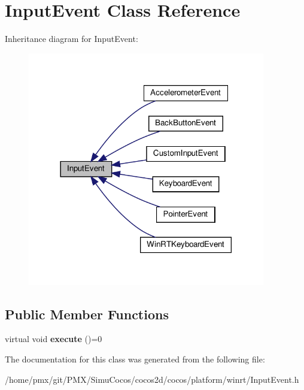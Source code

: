 \hypertarget{classInputEvent}{}\section{Input\+Event Class Reference}
\label{classInputEvent}


Inheritance diagram for Input\+Event\+:
\nopagebreak
\begin{figure}[H]
\begin{center}
\leavevmode
\includegraphics[width=294pt]{classInputEvent__inherit__graph}
\end{center}
\end{figure}
\subsection*{Public Member Functions}
\begin{DoxyCompactItemize}
\item 
\mbox{\label{classInputEvent_a3a5f93ba223b61729bcff6ec41116229}} 
virtual void {\bfseries execute} ()=0
\end{DoxyCompactItemize}


The documentation for this class was generated from the following file\+:\begin{DoxyCompactItemize}
\item 
/home/pmx/git/\+P\+M\+X/\+Simu\+Cocos/cocos2d/cocos/platform/winrt/Input\+Event.\+h\end{DoxyCompactItemize}

